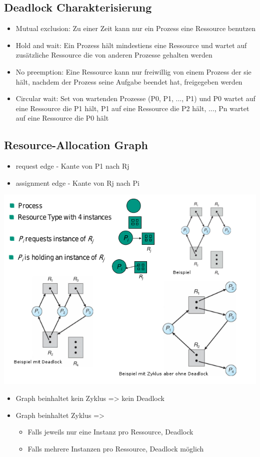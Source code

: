 \documentclass[a4paper]{scrreprt}
\begin{document}
		\subsection{Deadlock Charakterisierung}
			\begin{itemize}
				\item Mutual exclusion: Zu einer Zeit kann nur ein Prozess eine Ressource benutzen
				\item Hold and wait: Ein Prozess hält mindestiens eine Ressource und wartet auf zusätzliche Ressource die von anderen Prozesse gehalten werden
				\item No preemption: Eine Ressource kann nur freiwillig von einem Prozess der sie hält, nachdem der Prozess seine Aufgabe beendet hat, freigegeben werden
				\item Circular wait: Set von wartenden Prozesse (P0, P1, ..., P1) und P0 wartet auf eine Ressource die P1 hält, P1 auf eine Ressource die P2 hält, ..., Pn wartet auf eine Ressource die P0 hält
			\end{itemize}
		\subsection{Resource-Allocation Graph}
			\begin{itemize}
				\item request edge - Kante von P1 nach Rj
				\item assignment edge - Kante von Rj nach Pi
			\end{itemize}
		\includegraphics[scale=0.7]{resallograph.png}
			\begin{itemize}
				\item Graph beinhaltet kein Zyklus => kein Deadlock
				\item Graph beinhaltet Zyklus =>
					\begin{itemize}
						\item Falls jeweils nur eine Instanz pro Ressource, Deadlock
						\item Falls mehrere Instanzen pro Ressource, Deadlock möglich
					\end{itemize}
			\end{itemize}
\end{document}
